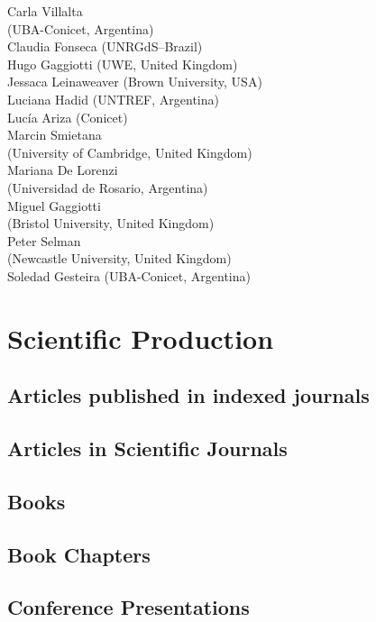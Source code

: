 \documentclass[english,a4paper,12pt,titlepage]{report}
\begin{document}
\begin{multicols}{2}
 Carla Villalta \\ (UBA-Conicet, Argentina) \\
 Claudia Fonseca (UNRGdS–Brazil) \\
 Hugo Gaggiotti (UWE, United Kingdom) \\
 Jessaca Leinaweaver (Brown University, USA) \\
 Luciana Hadid (UNTREF, Argentina) \\
 Lucía Ariza (Conicet)\\
 Marcin Smietana \\ (University of Cambridge, United Kingdom) \\
 Mariana De Lorenzi \\ (Universidad de Rosario, Argentina)\\
 Miguel Gaggiotti \\ (Bristol University, United Kingdom) \\
 Peter Selman \\ (Newcastle University, United Kingdom) \\
 Soledad Gesteira (UBA-Conicet, Argentina)\\

	
	\end{multicols}


  \chapter{Scientific Production}

  \section{Articles published in indexed journals}
  	
  \section{Articles in Scientific Journals}
  	
  \section{Books}
  	
  \section{Book Chapters}
  	
  \section{Conference Presentations}
  	
  
\end{document}
